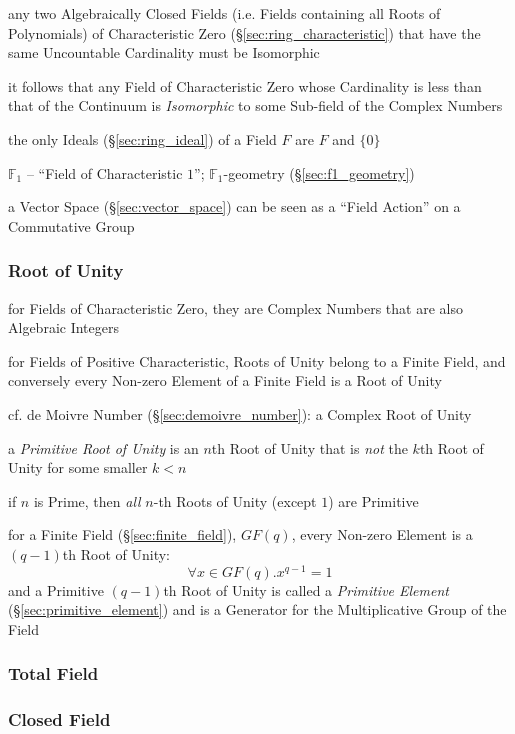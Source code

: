 any two Algebraically Closed Fields (i.e. Fields containing all Roots of
Polynomials) of Characteristic Zero (\S\ref{sec:ring_characteristic}) that have
the same Uncountable Cardinality must be Isomorphic

it follows that any Field of Characteristic Zero whose Cardinality is less than
that of the Continuum is \emph{Isomorphic} to some Sub-field of the Complex
Numbers

the only Ideals (\S\ref{sec:ring_ideal}) of a Field $F$ are $F$ and $\{0\}$

\fist $\mathbb{F}_1$ -- ``Field of Characteristic $1$''; $\mathbb{F}_1$-geometry
(\S\ref{sec:f1_geometry})

a Vector Space (\S\ref{sec:vector_space}) can be seen as a ``Field Action'' on a
Commutative Group



\subsubsection{Root of Unity}\label{sec:root_of_unity}

for Fields of Characteristic Zero, they are Complex Numbers that are also
Algebraic Integers

for Fields of Positive Characteristic, Roots of Unity belong to a Finite Field,
and conversely every Non-zero Element of a Finite Field is a Root of Unity

cf. de Moivre Number (\S\ref{sec:demoivre_number}): a Complex Root of Unity

a \emph{Primitive Root of Unity} is an $n$th Root of Unity that is \emph{not}
the $k$th Root of Unity for some smaller $k < n$

if $n$ is Prime, then \emph{all} $n$-th Roots of Unity (except $1$) are
Primitive

for a Finite Field (\S\ref{sec:finite_field}), $GF(q)$, every Non-zero Element
is a $(q-1)$th Root of Unity:
\[
  \forall x \in GF(q). x^{q-1} = 1
\]
and a Primitive $(q-1)$th Root of Unity is called a \emph{Primitive Element}
(\S\ref{sec:primitive_element}) and is a Generator for the Multiplicative Group
of the Field



\subsubsection{Total Field}\label{sec:total_field}

\subsubsection{Closed Field}\label{sec:closed_field}

